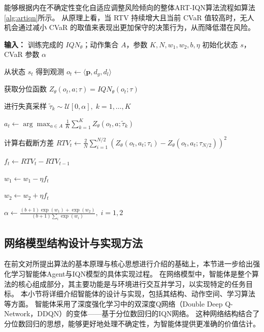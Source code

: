 能够根据内在不确定性变化自适应调整风险倾向的整体ART-IQN算法流程如算法\ref{alg:artiqn}所示。
从原理上看，当 RTV 持续增大且当前 CVaR 值较高时，无人机会通过减小 CVaR 的取值来表现出更加保守的决策行为，从而降低潜在风险。


\begin{algorithm}[H]
  \caption{自适应风险倾向隐式分位网络无人机导航算法}
  \label{alg:artiqn}
  \begin{algorithmic}[1]
  
  \State \textbf{输入：} 训练完成的 $IQN_{\theta}$；动作集合 $A$，参数 $K, N, w_1, w_2, b, \eta$
  \State 初始化状态 $s$，CVaR 参数 $\alpha$
  
  
  \State 从状态 $s_t$ 得到观测 $o_t \gets \langle \mathbf{p}, d_g, d_l \rangle$
  
  \State 获取分位函数 $Z_{\theta}(o_t,a;\tau)=IQN_{\theta}(o_t;\tau)$
  
  \State 进行失真采样 $\tilde{\tau}_k \sim \mathcal{U}[0,\alpha],\; k=1,\dots,K$
  
  \State $a_t \gets 
  \displaystyle \arg\max_{a\in A}
  \frac{1}{K}\sum_{k=1}^{K} Z_{\theta}(o_t,a;\tilde{\tau}_k)$
  
  \State 计算右截断方差 $RTV_t \gets 
  \displaystyle \frac{2}{N}
  \sum_{i=1}^{N/2}
  \left(
  Z_{\theta}(o_t,a_t;\tau_i)
  -
  Z_{\theta}(o_t,a_t;\tau_{N/2})
  \right)^2$
  
  \State $f_t \gets RTV_t - RTV_{t-1}$
  
  \State $w_1 \gets w_1 - \eta f_t$
  
  \State $w_2 \gets w_2 + \eta f_t$
  
  \State $\alpha \gets 
  \displaystyle
  \frac{(b+1)\exp(w_1)+\exp(w_2)}
  {(b+1)\sum_i \exp(w_i)},\; i=1,2$
  
  \EndWhile
  
  \end{algorithmic}
  \end{algorithm}

\subsection{网络模型结构设计与实现方法}
在前文对所提出算法的基本原理与核心思想进行介绍的基础上，本节进一步给出强化学习智能体Agent与IQN模型的具体实现过程。
在网络模型中，智能体是整个算法的核心组成部分，其主要功能是与环境进行交互并学习，以实现特定的任务目标。
本小节将详细介绍智能体的设计与实现，包括其结构、动作空间、学习算法等方面。
智能体采用了深度强化学习中的双深度Q网络（Double Deep Q-Network，DDQN）的变体——基于分位数回归的IQN网络。
这种网络结构结合了分位数回归的思想，能够更好地处理不确定性，为智能体提供更准确的价值估计。

